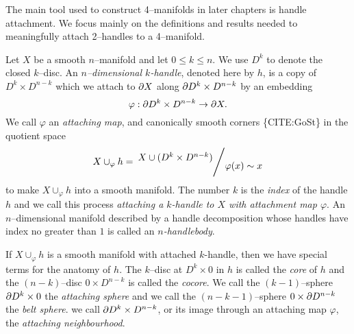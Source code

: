 The main tool used to construct 4--manifolds in later chapters is handle attachment.
We focus mainly on the definitions and results needed to meaningfully attach 2--handles to a 4--manifold.

\begin{defn}
\label{def:handle}
Let $X$ be a smooth $n$--manifold and let $0\leq k\leq n$.
We use $D^k$ to denote the closed $k$--disc.
An \emph{$n$--dimensional $k$-handle}, denoted here by $h$, is a copy of $D^k\times D^{n-k}$ which we attach to $\partial X$ along $\partial D^k\times D^{n-k}$ by an embedding
\[
  \varphi : \partial D^k \times D^{n-k} \to \partial X.
\]
We call $\varphi$ an \emph{attaching map}, and canonically smooth corners \{CITE:GoSt\} in the quotient space
\[
  X\cup_\varphi h = \quotient{X \cup ( D^k\times D^{n-k} ) }{ \varphi(x) \sim x }
\]
to make $X\cup_\varphi h$ into a smooth manifold.
The number $k$ is the \emph{index} of the handle $h$ and we call this process \emph{attaching a $k$-handle to $X$ with attachment map $\varphi$}.
An $n$--dimensional manifold described by a handle decomposition whose handles have index no greater than $1$ is called an \emph{$n$-handlebody}.
\end{defn}





If $X\cup_\varphi h$ is a smooth manifold with attached $k$-handle, then we have special terms for the anatomy of $h$.
The $k$--disc at $D^k\times 0$ in $h$ is called the \emph{core} of $h$ and the $(n-k)$--disc $0 \times D^{n-k}$ is called the \emph{cocore}.
We call the $(k-1)$--sphere $\partial D^k \times 0$ the \emph{attaching sphere} and we call the $(n-k-1)$--sphere $ 0 \times \partial D^{n-k}$ the \emph{belt sphere}.
we call $\partial D^k\times D^{n-k}$, or its image through an attaching map $\varphi$, the \emph{attaching neighbourhood}.

